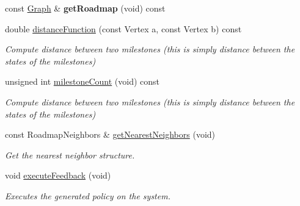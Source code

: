 \begin{DoxyCompactItemize}
\item 
\hypertarget{class_f_i_r_m_aacad0b0dfc1413f78c6dc76fdbac9ce7}{const \hyperlink{class_f_i_r_m_a687e9f4243b22c30ee1fa5da22a85053}{\-Graph} \& {\bfseries get\-Roadmap} (void) const }\label{class_f_i_r_m_aacad0b0dfc1413f78c6dc76fdbac9ce7}

\item 
\hypertarget{class_f_i_r_m_a9a98fdb0da781d77fe6ff9a55e8a7a34}{double \hyperlink{class_f_i_r_m_a9a98fdb0da781d77fe6ff9a55e8a7a34}{distance\-Function} (const \-Vertex a, const \-Vertex b) const }\label{class_f_i_r_m_a9a98fdb0da781d77fe6ff9a55e8a7a34}

\begin{DoxyCompactList}\small\item\em \-Compute distance between two milestones (this is simply distance between the states of the milestones) \end{DoxyCompactList}\item 
\hypertarget{class_f_i_r_m_a558fbb0135ab096d3cd06e65b88533de}{unsigned int \hyperlink{class_f_i_r_m_a558fbb0135ab096d3cd06e65b88533de}{milestone\-Count} (void) const }\label{class_f_i_r_m_a558fbb0135ab096d3cd06e65b88533de}

\begin{DoxyCompactList}\small\item\em \-Compute distance between two milestones (this is simply distance between the states of the milestones) \end{DoxyCompactList}\item 
\hypertarget{class_f_i_r_m_ad6df82888d88ab8479f92f9f3e453c2e}{const \-Roadmap\-Neighbors \& \hyperlink{class_f_i_r_m_ad6df82888d88ab8479f92f9f3e453c2e}{get\-Nearest\-Neighbors} (void)}\label{class_f_i_r_m_ad6df82888d88ab8479f92f9f3e453c2e}

\begin{DoxyCompactList}\small\item\em \-Get the nearest neighbor structure. \end{DoxyCompactList}\item 
\hypertarget{class_f_i_r_m_ae448791d4c9af9016bc9d5e9de166f0e}{void \hyperlink{class_f_i_r_m_ae448791d4c9af9016bc9d5e9de166f0e}{execute\-Feedback} (void)}\label{class_f_i_r_m_ae448791d4c9af9016bc9d5e9de166f0e}

\begin{DoxyCompactList}\small\item\em \-Executes the generated policy on the system. \end{DoxyCompactList}\end{DoxyCompactItemize}
